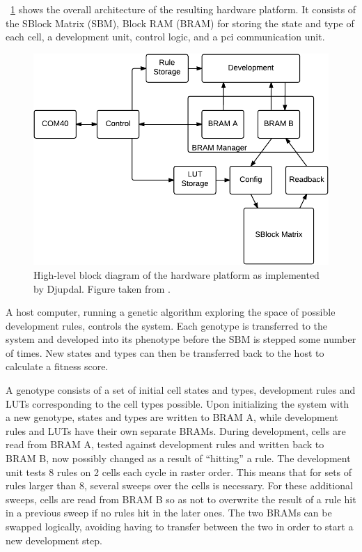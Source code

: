 \figurename~\ref{fig:overview-djupdal} shows the overall architecture of the
resulting hardware platform. It consists of the SBlock Matrix (SBM), Block RAM
(BRAM) for storing the state and type of each cell, a development unit, control
logic, and a \acrshort{pci} communication unit.

\begin{figure}[!ht]
    \centering
    \includegraphics[width=0.8\linewidth]{fig/overview-djupdal}
    \caption[Djupdal's hardware design]{
        High-level block diagram of the hardware platform as implemented by
        Djupdal. Figure taken from \cite{Lundal2015a}.
    }
    \label{fig:overview-djupdal}
\end{figure}

A host computer, running a genetic algorithm exploring the space of possible
development rules, controls the system. Each genotype is transferred to the
system and developed into its phenotype before the SBM is stepped some number of
times. New states and types can then be transferred back to the host to
calculate a fitness score.

A genotype consists of a set of initial cell states and types, development rules
and LUTs corresponding to the cell types possible. Upon initializing the system
with a new genotype, states and types are written to BRAM A, while development
rules and LUTs have their own separate BRAMs. During development, cells are read
from BRAM A, tested against development rules and written back to BRAM B, now possibly
changed as a result of ``hitting'' a rule. The development unit tests 8 rules on
2 cells each cycle in raster order. This means that for sets of rules larger
than 8, several sweeps over the cells is necessary. For these additional sweeps,
cells are read from BRAM B so as not to overwrite the result of a rule hit in a
previous sweep if no rules hit in the later ones. The two BRAMs can be swapped
logically, avoiding having to transfer between the two in order to start a new
development step.

